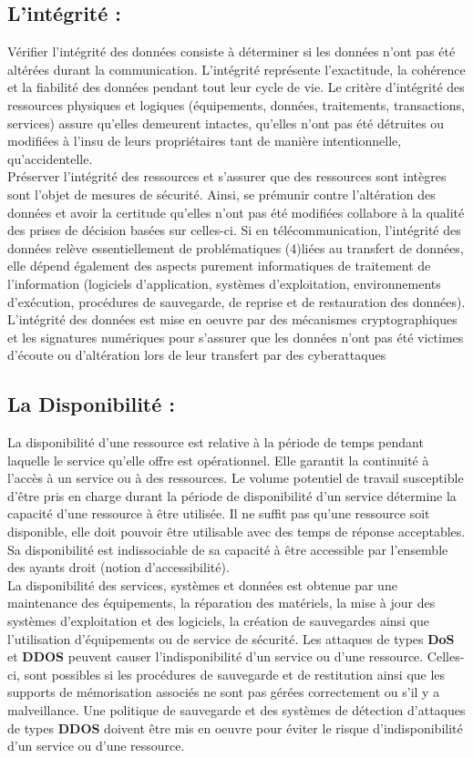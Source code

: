 \subsection{L’intégrité :}
Vérifier l’intégrité des données consiste à déterminer si les données n'ont pas été altérées durant la communication. L’intégrité représente l’exactitude, la cohérence et la fiabilité des données pendant tout leur cycle de vie. Le critère d’intégrité des ressources physiques et logiques (équipements, données, traitements, transactions, services) assure qu’elles demeurent intactes, qu’elles n’ont pas été détruites ou modifiées à l’insu de leurs propriétaires tant de manière intentionnelle, qu’accidentelle.\\

Préserver l’intégrité des ressources et s’assurer que des ressources sont intègres sont l’objet de mesures de sécurité. Ainsi, se prémunir contre l’altération des données et avoir la certitude qu’elles n’ont pas été modifiées collabore à la qualité des prises de décision basées sur celles-ci. Si en télécommunication, l’intégrité des données relève essentiellement de problématiques (4)liées au transfert de données, elle dépend également des aspects purement informatiques de traitement de l’information (logiciels d’application, systèmes d’exploitation, environnements d’exécution, procédures de sauvegarde, de reprise et de restauration des données). L’intégrité des données est mise en oeuvre par des mécanismes cryptographiques et les signatures numériques pour s’assurer que les données n’ont pas été victimes d’écoute ou d’altération lors de leur transfert par des cyberattaques
\subsection{La Disponibilité :}
La disponibilité d’une ressource est relative à la période de temps pendant laquelle le service qu’elle offre est opérationnel. Elle garantit la continuité à l’accès à un service ou à des ressources. Le volume potentiel de travail susceptible d’être pris en charge durant la période de disponibilité d’un service détermine la capacité d’une ressource à être utilisée. Il ne suffit pas qu’une ressource soit disponible, elle doit pouvoir être utilisable avec des temps de réponse acceptables. Sa disponibilité est indissociable de sa capacité à être accessible par l’ensemble des ayants droit (notion d’accessibilité).\\

La disponibilité des services, systèmes et données est obtenue par une maintenance des équipements, la réparation des matériels, la mise à jour des systèmes d’exploitation et des logiciels, la création de sauvegardes ainsi que l’utilisation d’équipements ou de service de sécurité. Les attaques de types \textbf{DoS} et \textbf{DDOS}  peuvent causer l’indisponibilité d’un service ou d’une ressource. Celles-ci, sont possibles si les procédures de sauvegarde et de restitution ainsi que les supports de mémorisation associés ne sont pas gérées correctement ou s’il y a malveillance. Une politique de sauvegarde et des systèmes de détection d’attaques de types \textbf{DDOS} doivent être mis en oeuvre pour éviter le risque d’indisponibilité d’un service ou d’une ressource.
